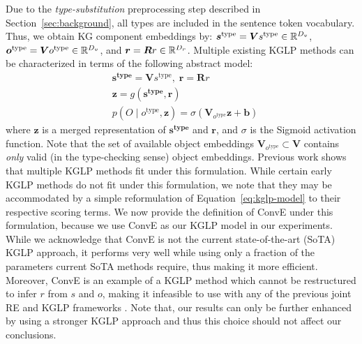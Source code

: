 Due to the {\em type-substitution} preprocessing step described in Section~\ref{sec:background}, all types are included in the sentence token vocabulary.
Thus, we obtain KG component embeddings by:
$\bm{s^{\textrm{type}}} = \bm{V} s^{\textrm{type}} \in \smash{\mathbb{R}^{D_v}}$,
$\bm{o^{\textrm{type}}} = \bm{V} o^{\textrm{type}} \in \smash{\mathbb{R}^{D_v}}$, and
$\bm{r} = \bm{R} r \in \smash{\mathbb{R}^{D_r}}$.
Multiple existing KGLP methods can be characterized in terms of the following abstract model:
\begin{align}
    & \bm{s^{\textrm{type}}} = \bm{V} s^{\textrm{type}},\;
      \bm{r} = \bm{R} r \\
    & \bm{z} = g(\bm{s^{\textrm{type}}}, \bm{r}) \\
    & p(O \mid o^{\textrm{type}}, \bm{z}) = \sigma(\bm{V}_{o^{\textrm{type}}}\bm{z} + \bm{b})
    \label{eq:kglp-model}
\end{align}
where $\bm{z}$ is a merged representation of $\bm{s^{\textrm{type}}}$ and $\bm{r}$, and $\sigma$ is the Sigmoid activation function.
Note that the set of available object embeddings $\bm{V}_{o^{\textrm{type}}} \subset \bm{V}$ contains {\em only} valid (in the type-checking sense) object embeddings.
Previous work \citep{coper} shows that multiple KGLP methods fit under this formulation. 
While certain early KGLP methods \citep{bordes2013translating, yang2015embedding, transr_ctranr, transd, trouillon2016complex} do not fit under this formulation, we note that they may be accommodated by a simple reformulation of Equation~\ref{eq:kglp-model} to their respective scoring terms.
We now provide the definition of ConvE \citep{dettmers2018conve} under this formulation, because we use ConvE as our KGLP model in our experiments.
While we acknowledge that ConvE is not the current state-of-the-art (SoTA) KGLP approach, it performs very well while using only a fraction of the parameters current SoTA \cite{coper, GAAT} methods require, thus making it more efficient.
Moreover, ConvE is an example of a KGLP method which cannot be restructured to infer $r$ from $s$ and $o$, making it infeasible to use with any of the previous joint RE and KGLP frameworks \citep[e.g.,][]{lfds,weston-2013}.
Note that, our results can only be further enhanced by using a stronger KGLP approach and thus this choice should not affect our conclusions.

